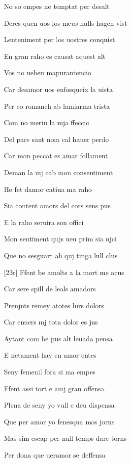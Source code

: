 \documentclass[12pt]{article}
\begin{document}
\begin{estrofa}

 No so empes ne temptat per desalt

 Deres quen uos los me\textit{us} hulls hagen vist

 Lenteniment per los uostres conquist

 En gran raho es causat aquest alt

 Vos no ueheu mapurantencio

 Car desamor uos enfosqueix la uista

 Per co romanch ab lamiarma trista

 Com no meriu la mja ffeccio

\end{estrofa}



\begin{estrofa}

 Del pare sant nom cal hauer perdo

 Car mon peccat es amar follament

 Deman la mj cab mon consentiment

 He fet damor catiua ma raho

 Sia content amors del cors sens pus

 E la raho seruira son offici

 Mon sentiment qujs ueu prim sia njci

 Que no sesguart ab quj tinga lull clus

\end{estrofa}



\begin{estrofa}

 [23r] Ffent be amolts a la mort me acus

 Car sere spill de leals amadors

 Prenjnts remey atotes lurs dolors

 Car enuers mj tota dolor es jus

 Aytant com he pus alt leuada pensa

 E netament hay en amor entes

 Seny femenil fora si ma empes

 Ffent assi tort e amj gran offensa

\end{estrofa}



\begin{estrofa}

 Plena de seny yo vull e deu dispensa

 Que per amor yo fenesqua mos jorns

 Mas sim escap per null temps dare torns

 Per dona que ueramor se deffensa

\end{estrofa}
\end{document}
